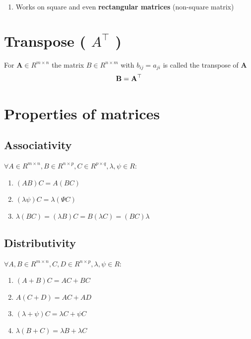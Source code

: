 \begin{enumerate}
    \item Works on square and even \textbf{rectangular matrices} (non-square matrix)
\end{enumerate}


\section{Transpose ( $A^\top$ ) \cite{mfml-1}}\label{matrix: Transpose}
For $\mathbf{A} \in R^{m\times n}$ the matrix $B \in R^{n\times m}$ with $b_{ij} = a_{ji}$ is called the transpose of $\mathbf{A}$
\[
    \hfill
    \mathbf{B = A}^\top
    \hfill
\]


\section{Properties of matrices}

\subsection{Associativity \cite{mfml-1}}\label{matrix: Associativity}

$\forall A \in R^{m\times n} , B \in R^{n\times p} , C \in R^{p\times q} , \lambda, \psi \in R$:

\begin{enumerate}
    \item $(AB)C = A(BC)$
    
    \item $(\lambda\psi)C = \lambda(\Psi C)$

    \item  $\lambda(BC) = (\lambda B)C = B(\lambda C) = (BC)\lambda$
\end{enumerate}


\subsection{Distributivity \cite{mfml-1}}\label{matrix: Distributivity}

$\forall A, B \in R^{m\times n} , C, D \in R^{n\times p} , \lambda, \psi \in R$:

\begin{enumerate}[itemsep=0.2cm]
    \item $(A + B)C = AC + BC$
    \item $A(C + D) = AC + AD$
    \item $(\lambda + \psi)C = \lambda C + \psi C$
    \item $\lambda (B + C) = \lambda B + \lambda C$
\end{enumerate}



